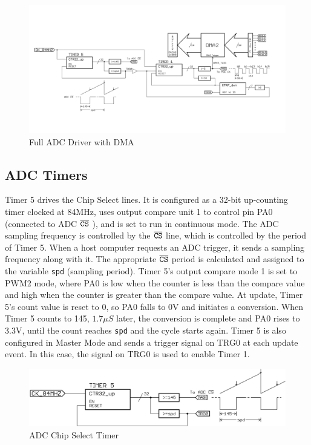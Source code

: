 \documentclass[11pt,twoside]{mitthesis}
\begin{document}
\begin{figure}[H]
  \begin{center}
      \includegraphics[width=1\textwidth]{../ADC.png}
      \caption{Full ADC Driver with DMA}
  \end{center}
\end{figure}


\subsection{ADC Timers}

Timer 5 drives the Chip Select lines.
It is configured as a 32-bit up-counting timer clocked at 84MHz, uses output compare unit 1 to control pin PA0 (connected to ADC $\overline{\mbox{\texttt{CS}}}$ ), and is set to run in continuous mode.
The ADC sampling frequency is controlled by the $\overline{\mbox{\texttt{CS}}}$ line, which is controlled by the period of Timer 5.
When a host computer requests an ADC trigger, it sends a sampling frequency along with it.
The appropriate $\overline{\mbox{\texttt{CS}}}$ period is calculated and assigned to the variable \texttt{spd} (sampling period).
Timer 5's output compare mode 1 is set to PWM2 mode, where PA0 is low when the counter is less than the compare value and high when the counter is greater than the compare value.
At update, Timer 5's count value is reset to 0, so PA0 falls to 0V and initiates a conversion.
When Timer 5 counts to 145, $1.7\mu S$ later, the conversion is complete and PA0 rises to 3.3V, until the count reaches \texttt{spd} and the cycle starts again.
Timer 5 is also configured in Master Mode and sends a trigger signal on TRG0 at each update event.
In this case, the signal on TRG0 is used to enable Timer 1.

\begin{figure}[H]
  \begin{center}
      \includegraphics[width=1\textwidth]{../tim5.png}
      \caption{ADC Chip Select Timer}
  \end{center}
\end{figure}
\end{document}
